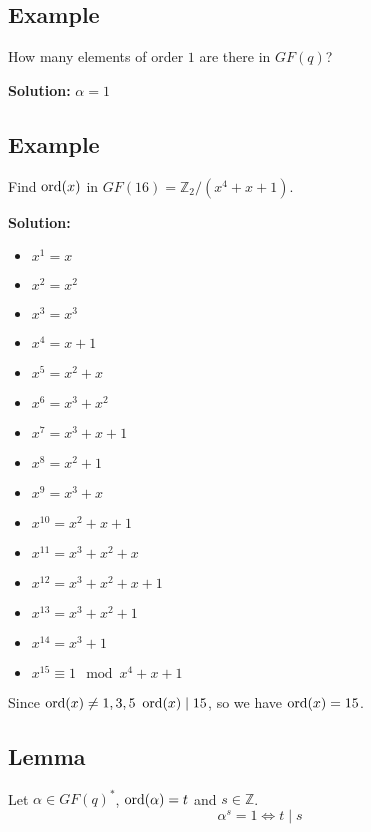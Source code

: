 \begin{exbox}
    \subsection{Example}
    How many elements of order $ 1 $ are there in $ GF(q) $?

    \textbf{Solution:} $ \alpha=1 $
\end{exbox}

\begin{exbox}
    \subsection{Example}
    Find $ \operatorname{ord}(x) $ in $ GF(16)=\mathbb{Z}_2/(x^4+x+1) $.

    \textbf{Solution:}
    \begin{itemize}
        \item $ x^1=x $
        \item $ x^2=x^2 $
        \item $ x^3=x^3 $
        \item $ x^4=x+1 $
        \item $ x^5=x^2+x $
        \item $ x^6=x^3+x^2 $
        \item $ x^7=x^3+x+1 $
        \item $ x^8=x^2+1 $
        \item $ x^9=x^3+x $
        \item $ x^{10}=x^2+x+1 $
        \item $ x^{11}=x^3+x^2+x $
        \item $ x^{12}=x^3+x^2+x+1 $
        \item $ x^{13}=x^3+x^2+1 $
        \item $ x^{14}=x^3+1 $
        \item $ x^15\equiv 1\mod x^4+x+1 $
    \end{itemize}
    Since $ \operatorname{ord}(x)\neq 1,3,5 $ $ \operatorname{ord}(x)\mid 15 $, so we have $ \operatorname{ord}(x)=15 $.
\end{exbox}

\begin{thmbox}
    \begin{theorem}
    \subsection{Lemma}
    Let $ \alpha\in GF(q)^* $, $ \operatorname{ord}(\alpha)=t $ and $ s\in\mathbb{Z} $.
    \[ \alpha^s=1\iff t\mid s \]
\end{theorem} \end{thmbox}

